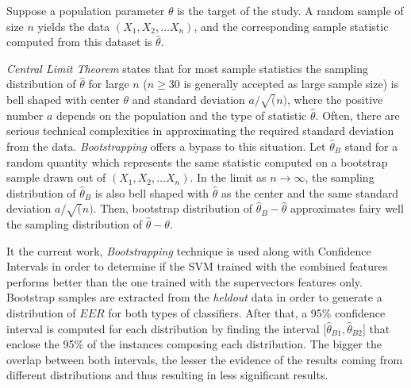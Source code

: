 Suppose a population parameter $\theta$ is the target of the study. A random sample
of size $n$ yields the data $(X_{1}, X_{2}, \dotsc X_{n})$, and the corresponding
sample statistic computed from this dataset is ${\hat{\theta}}$.

\textit{Central Limit Theorem} states that for most sample
statistics the sampling distribution of ${\hat{\theta}}$ for large $n$
($n \geq 30$ is generally accepted as large sample size) is bell shaped with
center $\theta$ and standard deviation $a / \sqrt(n)$, where the positive number $a$
depends on the population and the type of statistic ${\hat{\theta}}$.
Often, there are serious technical complexities in approximating the required
standard deviation from the data. \textit{Bootstrapping} offers a bypass to this situation.
Let ${\hat{\theta}}_{B}$ stand for a random quantity which represents the same statistic
computed on a bootstrap sample drawn out of $(X_{1}, X_{2}, \dotsc X_{n})$.
In the limit as $n \to \infty$, the sampling distribution of ${\hat{\theta}}_{B}$
is also bell shaped with ${\hat{\theta}}$ as the center and the same standard deviation
$a / \sqrt(n)$. Then, bootstrap distribution of $\hat{\theta}_{B} - \hat{\theta}$
approximates fairy well the sampling distribution of $\hat{\theta} - \theta$.

It the current work, \textit{Bootstrapping} technique is used along with Confidence
Intervals in order to determine if the SVM trained with the combined features
performs better than the one trained with the supervectors features only.
Bootstrap samples are extracted from the \textit{heldout} data in order
to generate a distribution of $EER$ for both types of classifiers. After that,
a 95\% confidence interval is computed for each distribution by finding the interval
[$\hat{\theta}_{B1}, \hat{\theta}_{B2}$] that enclose the 95\% of the instances
composing each distribution. The bigger the overlap between both intervals, the
lesser the evidence of the results coming from different distributions and thus
resulting in less significant results.

